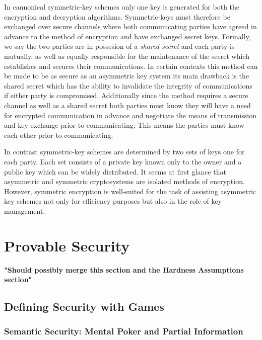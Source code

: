 In cannonical symmetric-key schemes only one key is generated for both the encryption and decryption algorithms. Symmetric-keys must therefore be exchanged over secure channels where both communicating parties have agreed in advance to the method of
encryption and have exchanged secret keys. 
\newline
Formally, we say the two parties are in possesion of a \textit{shared secret} and each party is mutually, as well as equally responsible for the maintenance of the secret which establishes and secures their communications. 
In certain contexts this method can be made to be as secure as an asymmetric key system its main drawback is the shared secret which has the ability to invalidate the
integrity of communications if either party is compromised.
\newline
Additionally since the method requires a secure channel as well as a
shared secret both parties must know they will have a need for
encrypted communication in advance and negotiate the means of
transmission and key exchange prior to communicating. This means the parties must know each other prior to communicating. 


In contrast symmetric-key schemes are determined by two sets of keys one for each party. Each set consists of a private key known only to the owner and a public key which can be widely distributed. It seems at first glance that asymmetric and symmetric cryptosystems are isolated methods of encryption. However, symmetric
encryption is well-suited for the task of assisting asymmetric key
schemes not only for efficiency purposes but also in the role of key
management. 

\section{Provable Security} 
\textbf{"Should possibly merge this section and the Hardness Assumptions section"} 

\subsection{Defining Security with Games} 

\subsubsection{Semantic Security: Mental Poker and Partial Information} 

